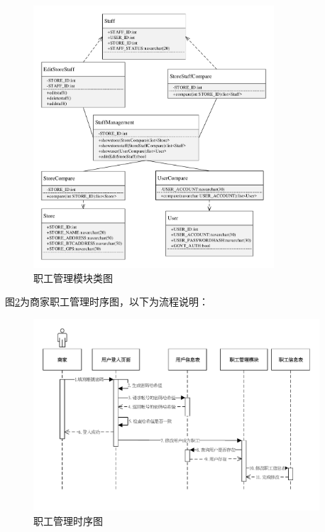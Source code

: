 	\begin{figure}[!htbp]
		\centering
		\includegraphics[width = 0.8\textwidth]{c1.pdf}
		\caption{职工管理模块类图}\label{c1}
	\end{figure}

	

	图\ref{time2}为商家职工管理时序图，以下为流程说明：

	\begin{figure}[!htbp]
		\centering
		\includegraphics[width = 0.95\textwidth]{time2.pdf}
		\caption{职工管理时序图}\label{time2}
	\end{figure}

